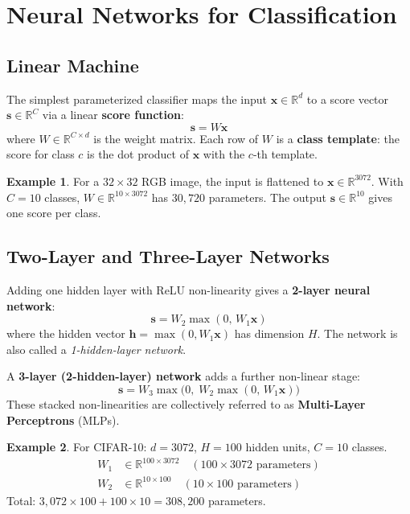 \documentclass[11pt,a4paper]{article}
\theoremstyle{definition}
\newtheorem{example}{Example}[section]
\theoremstyle{plain}
\theoremstyle{remark}
\begin{document}
\section{Neural Networks for Classification}

\subsection{Linear Machine}

The simplest parameterized classifier maps the input $\mathbf{x} \in \mathbb{R}^d$ to a score vector $\mathbf{s} \in \mathbb{R}^C$ via a linear \textbf{score function}:
\[
    \mathbf{s} = W\mathbf{x}
\]
where $W \in \mathbb{R}^{C \times d}$ is the weight matrix. Each row of $W$ is a \textbf{class template}: the score for class $c$ is the dot product of $\mathbf{x}$ with the $c$-th template.

\begin{example}
For a $32 \times 32$ RGB image, the input is flattened to $\mathbf{x} \in \mathbb{R}^{3072}$.
With $C = 10$ classes, $W \in \mathbb{R}^{10 \times 3072}$ has $30{,}720$ parameters.
The output $\mathbf{s} \in \mathbb{R}^{10}$ gives one score per class.
\end{example}

\subsection{Two-Layer and Three-Layer Networks}

Adding one hidden layer with ReLU non-linearity gives a \textbf{2-layer neural network}:
\[
    \mathbf{s} = W_2 \max(0,\, W_1 \mathbf{x})
\]
where the hidden vector $\mathbf{h} = \max(0, W_1 \mathbf{x})$ has dimension $H$.
The network is also called a \emph{1-hidden-layer network}.

A \textbf{3-layer (2-hidden-layer) network} adds a further non-linear stage:
\[
    \mathbf{s} = W_3 \max\!\bigl(0,\; W_2 \max(0,\, W_1 \mathbf{x})\bigr)
\]
These stacked non-linearities are collectively referred to as \textbf{Multi-Layer Perceptrons} (MLPs).

\begin{example}
For CIFAR-10: $d = 3072$, $H = 100$ hidden units, $C = 10$ classes.
\begin{align*}
    W_1 &\in \mathbb{R}^{100 \times 3072} \quad (100 \times 3072\text{ parameters}) \\
    W_2 &\in \mathbb{R}^{10 \times 100}  \quad (10 \times 100\text{ parameters})
\end{align*}
Total: $3{,}072 \times 100 + 100 \times 10 = 308{,}200$ parameters.
\end{example}
\end{document}
